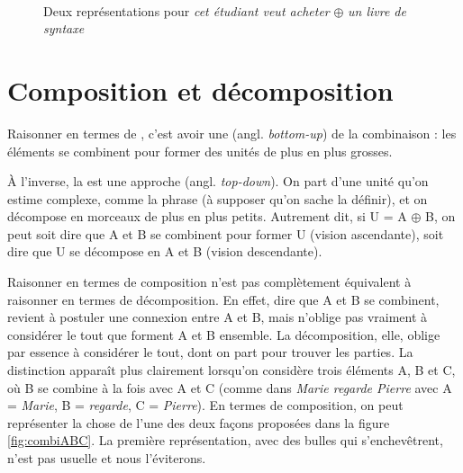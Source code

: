 \begin{figure}
\medskip\\
\caption{\label{fig:}Deux représentations pour \textit{cet étudiant veut acheter} $\oplus$ \textit{un livre de syntaxe}}
\end{figure}



\section{Composition et décomposition}\label{sec:3.2.13}

Raisonner en termes de , c’est avoir une  (angl. \textit{bottom-up}) de la combinaison : les éléments se combinent pour former des unités de plus en plus grosses.

À l’inverse, la  est une approche  (angl. \textit{top-down}). On part d’une unité qu’on estime complexe, comme la phrase (à supposer qu’on sache la définir), et on décompose en morceaux de plus en plus petits. Autrement dit, si U = A ${\oplus}$ B, on peut soit dire que A et B se combinent pour former U (vision ascendante), soit dire que U se décompose en A et B (vision descendante).

Raisonner en termes de composition n’est pas complètement équivalent à raisonner en termes de décomposition. En effet, dire que A et B se combinent, revient à postuler une connexion entre A et B, mais n’oblige pas vraiment à considérer le tout que forment A et B ensemble. La décomposition, elle, oblige par essence à considérer le tout, dont on part pour trouver les parties. La distinction apparaît plus clairement lorsqu’on considère trois éléments A, B et C, où B se combine à la fois avec A et C (comme dans \textit{Marie regarde Pierre} avec A = \textit{Marie}, B = \textit{regarde}, C = \textit{Pierre}). En termes de composition, on peut représenter la chose de l’une des deux façons proposées dans la figure \ref{fig:combiABC}. La première représentation, avec des bulles qui s’enchevêtrent, n’est pas usuelle et nous l’éviterons.


